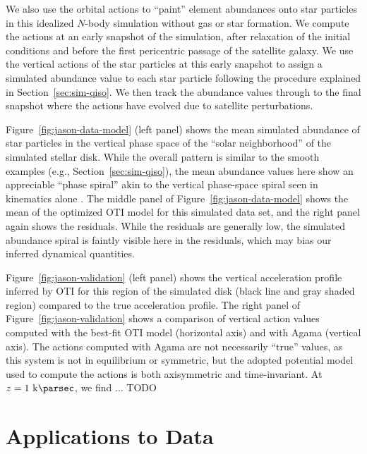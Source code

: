 We also use the orbital actions to ``paint'' element abundances onto star particles in
this idealized $N$-body simulation without gas or star formation.
We compute the actions at an early snapshot of the simulation, after relaxation of the
initial conditions and before the first pericentric passage of the satellite galaxy.
We use the vertical actions of the star particles at this early snapshot to assign a
simulated  abundance value to each star particle following the procedure
explained in Section~\ref{sec:sim-qiso}.
We then track the abundance values through to the final snapshot where the actions have
evolved due to satellite perturbations.

Figure~\ref{fig:jason-data-model} (left panel) shows the mean simulated 
abundance of star particles in the vertical phase space of the ``solar neighborhood'' of
the simulated stellar disk.
While the overall pattern is similar to the smooth examples (e.g.,
Section~\ref{sec:sim-qiso}), the mean abundance values here show an appreciable ``phase
spiral'' akin to the vertical phase-space spiral seen in kinematics alone
\citep{Antoja:2018}.
The middle panel of Figure~\ref{fig:jason-data-model} shows the mean  of
the optimized OTI model for this simulated data set, and the right panel again shows the
residuals.
While the residuals are generally low, the simulated abundance spiral is faintly visible
here in the residuals, which may bias our inferred dynamical quantities.

Figure~\ref{fig:jason-validation} (left panel) shows the vertical acceleration profile
inferred by OTI for this region of the simulated disk (black line and gray shaded
region) compared to the true acceleration profile.
The right panel of Figure~\ref{fig:jason-validation} shows a comparison of vertical
action values computed with the best-fit OTI model (horizontal axis) and with Agama
(vertical axis).
The actions computed with Agama are not necessarily ``true'' values, as this system is
not in equilibrium or symmetric, but the adopted potential model used to compute the
actions is both axisymmetric and time-invariant. 
At $z=1~\kpc$, we find ... TODO




\section{Applications to Data} \label{sec:applications-data}

